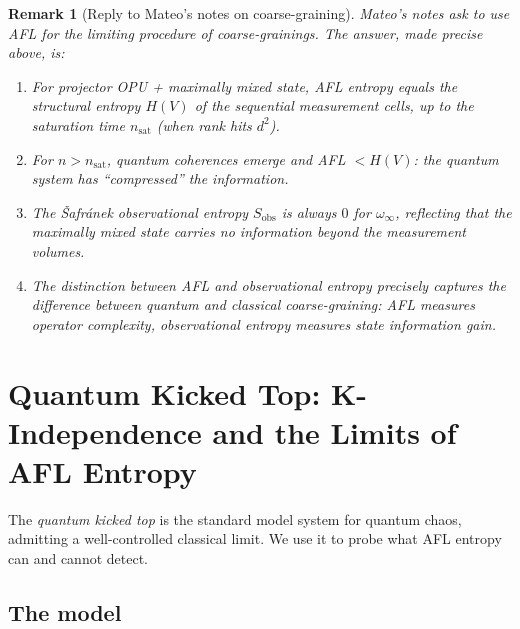 \documentclass[12pt,a4paper]{article}
\newtheorem{remark}[theorem]{Remark}
\begin{document}
\begin{remark}[Reply to Mateo's notes on coarse-graining]
Mateo's notes ask to use AFL for the limiting procedure of coarse-grainings.
The answer, made precise above, is:
\begin{enumerate}
  \item For projector OPU + maximally mixed state, AFL entropy \emph{equals}
        the structural entropy $H(V)$ of the sequential measurement cells,
        up to the saturation time $n_{\mathrm{sat}}$ (when rank hits $d^2$).
  \item For $n>n_{\mathrm{sat}}$, quantum coherences emerge and AFL $<H(V)$:
        the quantum system has ``compressed'' the information.
  \item The Šafránek observational entropy $S_{\mathrm{obs}}$ is always $0$
        for $\omega_\infty$, reflecting that the maximally mixed state carries
        no information beyond the measurement volumes.
  \item The distinction between AFL and observational entropy precisely
        captures the difference between quantum and classical coarse-graining:
        AFL measures operator complexity, observational entropy measures
        state information gain.
\end{enumerate}
\end{remark}

\section{Quantum Kicked Top: K-Independence and the Limits of AFL Entropy}
\label{sec:kicked}

The \emph{quantum kicked top} is the standard model system for quantum chaos,
admitting a well-controlled classical limit.  We use it to probe what AFL entropy
can and cannot detect.

\subsection{The model}
\end{document}
